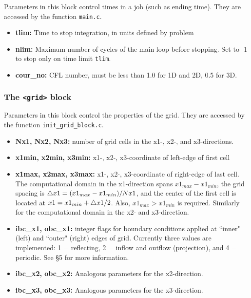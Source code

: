 Parameters in this block control times in a job (such as ending time).
They are accessed by the function {\tt main.c}.
\begin{itemize}

\item {\bf tlim:} Time to stop integration, in units defined by problem

\item {\bf nlim:} Maximum number of cycles of the main loop before stopping.
Set to -1 to stop only on time limit {\tt tlim}.

\item {\bf cour\_no:}  CFL number, must be less than 1.0 for 1D and 2D, 0.5
for 3D.

\end{itemize}

\subsubsection{The {\tt <grid>} block}

Parameters in this block control the properties of the grid. 
They are accessed by the function {\tt init\_grid\_block.c}.
\begin{itemize}

\item {\bf Nx1, Nx2, Nx3:} number of grid cells in the x1-, x2-, and x3-directions.

\item {\bf x1min, x2min, x3min:} x1-, x2-, x3-coordinate of left-edge of first cell

\item {\bf x1max, x2max, x3max:} x1-, x2-, x3-coordinate of right-edge of last cell.
The computational domain in the x1-direction spans $x1_{max}-x1_{min}$, the grid
spacing is $\bigtriangleup x1=(x1_{max}-x1_{min})/Nx1$, and the center of the
first cell is located at $x1=x1_{min} + \bigtriangleup x1/2$. Also, $x1_{max} >
x1_{min}$ is required.  Similarly for the computational domain in the 
x2- and x3-direction.

\item {\bf ibc\_x1, obc\_x1:} integer flags for boundary conditions applied
at ``inner" (left) and ``outer" (right) edges of grid.  Currently three
values are implemented: 1 = reflecting, 2 = inflow and outflow (projection), 
and 4 = periodic.  See \S 5 for more information.

\item {\bf ibc\_x2, obc\_x2:} Analogous parameters for the x2-direction.

\item {\bf ibc\_x3, obc\_x3:} Analogous parameters for the x3-direction.

\end{itemize}

